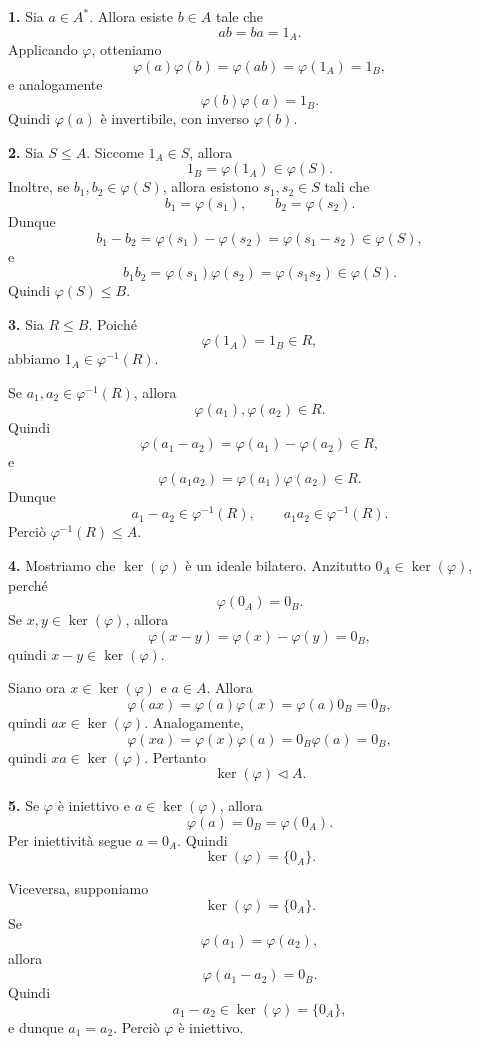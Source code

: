 \documentclass[a4paper]{article}
\begin{document}
\begin{radioactive}
\begin{snippetproof}{}
    \textbf{1.} Sia \(a\in A^\ast\). Allora esiste \(b\in A\) tale che
    \[
        ab=ba=1_A.
    \]
    Applicando \(\varphi\), otteniamo
    \[
        \varphi(a)\varphi(b)
        =
        \varphi(ab)
        =
        \varphi(1_A)
        =
        1_B,
    \]
    e analogamente
    \[
        \varphi(b)\varphi(a)=1_B.
    \]
    Quindi \(\varphi(a)\) è invertibile, con inverso \(\varphi(b)\).

    \textbf{2.} Sia \(S\leq A\). Siccome \(1_A\in S\), allora
    \[
        1_B=\varphi(1_A)\in \varphi(S).
    \]
    Inoltre, se \(b_1,b_2\in \varphi(S)\), allora esistono \(s_1,s_2\in S\) tali che
    \[
        b_1=\varphi(s_1),
        \qquad
        b_2=\varphi(s_2).
    \]
    Dunque
    \[
        b_1-b_2
        =
        \varphi(s_1)-\varphi(s_2)
        =
        \varphi(s_1-s_2)\in \varphi(S),
    \]
    e
    \[
        b_1b_2
        =
        \varphi(s_1)\varphi(s_2)
        =
        \varphi(s_1s_2)\in \varphi(S).
    \]
    Quindi \(\varphi(S)\leq B\).

    \textbf{3.} Sia \(R\leq B\).
    Poiché
    \[
        \varphi(1_A)=1_B\in R,
    \]
    abbiamo \(1_A\in \varphi^{-1}(R)\).

    Se \(a_1,a_2\in \varphi^{-1}(R)\), allora
    \[
        \varphi(a_1),\varphi(a_2)\in R.
    \]
    Quindi
    \[
        \varphi(a_1-a_2)
        =
        \varphi(a_1)-\varphi(a_2)\in R,
    \]
    e
    \[
        \varphi(a_1a_2)
        =
        \varphi(a_1)\varphi(a_2)\in R.
    \]
    Dunque
    \[
        a_1-a_2\in \varphi^{-1}(R),
        \qquad
        a_1a_2\in \varphi^{-1}(R).
    \]
    Perciò \(\varphi^{-1}(R)\leq A\).

    \textbf{4.} Mostriamo che \(\ker(\varphi)\) è un ideale bilatero.
    Anzitutto \(0_A\in\ker(\varphi)\), perché
    \[
        \varphi(0_A)=0_B.
    \]
    Se \(x,y\in\ker(\varphi)\), allora
    \[
        \varphi(x-y)=\varphi(x)-\varphi(y)=0_B,
    \]
    quindi \(x-y\in\ker(\varphi)\).

    Siano ora \(x\in\ker(\varphi)\) e \(a\in A\). Allora
    \[
        \varphi(ax)=\varphi(a)\varphi(x)=\varphi(a)0_B=0_B,
    \]
    quindi \(ax\in\ker(\varphi)\). Analogamente,
    \[
        \varphi(xa)=\varphi(x)\varphi(a)=0_B\varphi(a)=0_B,
    \]
    quindi \(xa\in\ker(\varphi)\).
    Pertanto
    \[
        \ker(\varphi)\triangleleft A.
    \]

    \textbf{5.} Se \(\varphi\) è iniettivo e \(a\in\ker(\varphi)\), allora
    \[
        \varphi(a)=0_B=\varphi(0_A).
    \]
    Per iniettività segue \(a=0_A\). Quindi
    \[
        \ker(\varphi)=\{0_A\}.
    \]

    Viceversa, supponiamo
    \[
        \ker(\varphi)=\{0_A\}.
    \]
    Se
    \[
        \varphi(a_1)=\varphi(a_2),
    \]
    allora
    \[
        \varphi(a_1-a_2)=0_B.
    \]
    Quindi
    \[
        a_1-a_2\in\ker(\varphi)=\{0_A\},
    \]
    e dunque \(a_1=a_2\). Perciò \(\varphi\) è iniettivo.
\end{snippetproof}
\end{radioactive}
\end{document}
